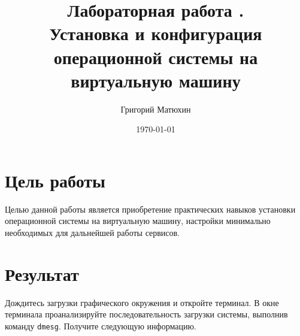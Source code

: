 \documentclass[12pt]{article}
\author{Григорий Матюхин}
\date{\today}
\title{Лабораторная работа \textnumero1.\\Установка и конфигурация операционной системы на виртуальную машину}
\begin{document}
  \maketitle
  \newpage
  \tableofcontents
  \newpage
  \section{Цель работы}
  Целью данной работы является приобретение практических навыков установки операционной системы на виртуальную машину, настройки минимально необходимых для дальнейшей работы сервисов.

  \section{Результат}
    Дождитесь загрузки графического окружения и откройте терминал. В окне терминала проанализируйте последовательность загрузки системы, выполнив команду \texttt{dmesg}. Получите следующую информацию.
\end{document}
